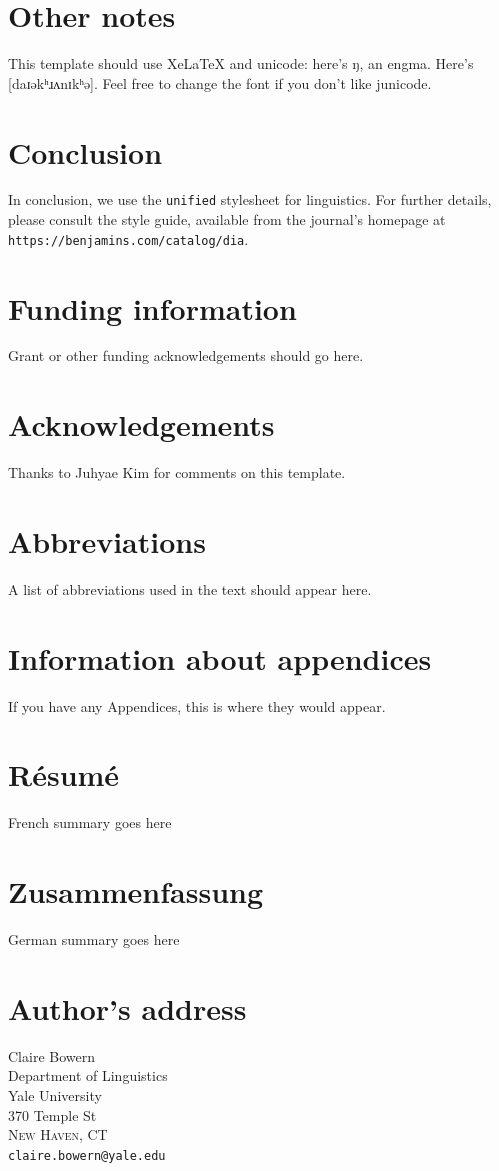 \documentclass[12pt,letterpaper]{article}
\begin{document}
\section{Other notes}
This template should use XeLaTeX and unicode: here's ŋ, an engma. Here's [daɪəkʰɹʌnɪkʰə]. Feel free to change the font if you don't like junicode.

\section{Conclusion}
In conclusion, we use the \texttt{unified} stylesheet for linguistics. For further details, please consult the style guide, available from the journal's homepage at \texttt{https://benjamins.com/catalog/dia}.

\section*{Funding information}
Grant or other funding acknowledgements should go here.

\section*{Acknowledgements}
Thanks to Juhyae Kim for comments on this template.

\section*{Abbreviations}
A list of abbreviations used in the text should appear here.






\bigskip

\appendix
\section{Information about appendices}
If you have any Appendices, this is where they would appear.

\section*{Résumé}

French summary goes here



\section*{Zusammenfassung}

German summary goes here

\bigskip

\section*{Author's address}
\medskip

\noindent\begin{minipage}{\linewidth}
Claire Bowern\\
Department of Linguistics\\
Yale University\\
370 Temple St\\
\textsc{New Haven}, CT\\[3ex]
\texttt{claire.bowern@yale.edu}
\end{minipage}
\end{document}
